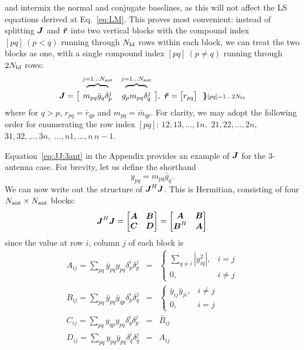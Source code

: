 \documentclass[useAMS,usenatbib]{mn2e}
\makeatletter
\newcommand{\mat}[1]{{\bmath{#1}}}
\newcommand{\JJ}{\mat{J}} %
\newcommand{\Matrix}[2]{\left [ \begin{array}{@{}#1@{}}#2\end{array} \right ]}
\newcommand{\AUG}[1]{\bmath{\breve{#1}}}
\newcommand{\Rr}{\AUG{r}}
\numberwithin{equation}{section}
\makeatother
\begin{document}
and intermix the normal and conjugate baselines, as this will not affect the LS equations derived at Eq.~\ref{eq:LM}.
This proves most convenient: instead of splitting $\JJ$ and $\Rr$ into 
two vertical blocks with the compound index $[pq]~(p<q)$ running through $N_\mathrm{bl}$ rows within each block, we can treat 
the two blocks as one, with a single compound index $[pq]~(p\ne q)$ running through $2N_\mathrm{bl}$ rows:
\begin{equation}
\label{eq:JJ:di}
\begin{array}{r@{~}cc@{~}cc}
                & \overbrace{~~~~~~~~}^{j=1\dots \Na} & \overbrace{~~~~~~~~}^{j=1\dots \Na} \\
\JJ = \big [ & m_{pq}\bar{g}_q\delta^{j}_p & g_p m_{pq} \delta^{j}_q & \big ],~
\Rr = \big [ r_{pq} \big ] ~~{\bm{\}} \scriptstyle [pq]=1\dots 2\Nbl}
\end{array}
\end{equation}
where for $q>p$, $r_{pq}=\bar{r}_{qp}$ and $m_{pq}=\bar{m}_{qp}$. For clarity, we may adopt the 
following order for enumerating the row index $[pq]$: $12,13,\dots,1n,$ $21,22,\dots,2n,$ $31,32,\dots,3n,$ $\dots,n1,\dots,n\,n-1$. 

Equation~\ref{eq:JJ:3ant} in the Appendix provides an example of $\JJ$ for the 3-antenna case. For
brevity, let us define the shorthand 
\begin{equation}
y_{pq} = m_{pq} \bar{g}_q. 
\end{equation}
We can now write out the 
structure of $\JJ^H\JJ$. This is Hermitian, consisting of four $N_\mathrm{ant}\times N_\mathrm{ant}$ blocks:
\begin{equation}
\label{eq:JHJ:DI:ABCD}
\JJ^H\JJ = \Matrix{cc}{\mat{A}&\mat{B}\\\mat{C}&\mat{D}} = \Matrix{cc}{\mat{A}&\mat{B}\\\mat{B}^H&\mat{A}}
\end{equation}
since the value at row $i$, column $j$ of each block is
\begin{eqnarray}
A_{ij} = \sum_{pq} \bar{y}_{pq} y_{pq} \delta^{i}_p \delta^{j}_p &=& 
  \left \{ \begin{array}{cc}
        \sum\limits_{q\ne i} |y_{iq}^2|, & \scriptstyle i=j \\
        0,  & \scriptstyle  i\ne j
  \end{array} \right .\nonumber\\ 
B_{ij} = \sum_{pq} \bar{y}_{pq} \bar{y}_{qp} \delta^{i}_p \delta^{j}_q &=& 
  \left \{ \begin{array}{cc}
      \bar{y}_{ij} \bar{y}_{ji}, & \scriptstyle i\ne j\\
      0, & \scriptstyle i=j
  \end{array} \right .\nonumber\\ 
C_{ij} = \sum_{pq} y_{qp} y_{pq} \delta^{i}_q \delta^{j}_p &=& 
  \bar{B}_{ij} \nonumber\\
D_{ij} = \sum_{pq} y_{pq} \bar{y}_{pq} \delta^{i}_q \delta^{j}_q &=& A_{ij} 
\label{eq:JHJ:DI:ABCD1}
\end{eqnarray}
\end{document}
